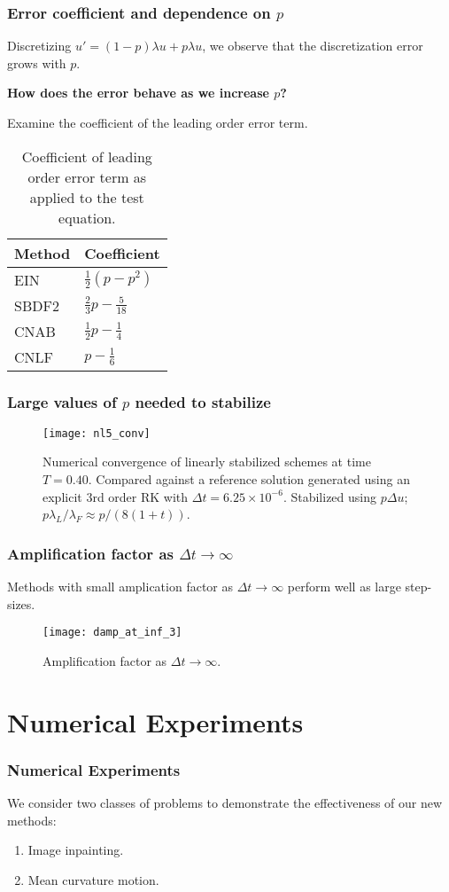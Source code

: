 \documentclass[hyperref={pdfpagelabels=false}]{beamer}
\begin{document}
\begin{frame}
	\frametitle{Error coefficient and dependence on $p$}
Discretizing $u' = (1- p)\lambda u + p\lambda u$, we observe that the discretization error grows with $p$.

\textbf{How does the error behave as we increase $p$?}

Examine the coefficient of the leading order error term.
\vspace{-11pt}
\begin{table}[b]
	\centering 
	\caption{Coefficient of leading order error term as applied to the test equation.}
\renewcommand{\arraystretch}{1.10}
	\begin{tabular}{ll} 
		\toprule 
Method & Coefficient 
\\ \midrule 
EIN & $\frac{1}{2}(p-p^2)$ 
\\
SBDF2 & $\frac{2}{3}p - \frac{5}{18}$
\\ 
CNAB & $\frac{1}{2}p-\frac{1}{4}$
\\ 
CNLF & $p-\frac{1}{6}$
\\ \bottomrule
		\end{tabular}
	\end{table}
\end{frame}


\begin{frame}
	\frametitle{Large values of $p$ needed to stabilize}
	\begin{figure}[t]
		\centering
		\texttt{[image: nl5\_conv]}
		\caption{Numerical convergence of linearly stabilized schemes at time $T=0.40$. Compared against a reference solution generated using an explicit 3rd order RK with $\Delta t = 6.25\times 10^{-6}$. Stabilized using $p\Delta u$; $p\lambda_L / \lambda_F \approx p/(8(1+t))$.}
	\end{figure} 
\end{frame}

\begin{frame}
	\frametitle{Amplification factor as $\Delta t\to\infty$}
Methods with small amplication factor as $\Delta t \to \infty$ perform well as large step-sizes. 
\vspace{-5pt}
\begin{figure}
	\centering 
	\texttt{[image: damp\_at\_inf\_3]}
	\caption{Amplification factor as $\Delta t \to \infty$.}
\end{figure}
\end{frame}

\section{Numerical Experiments}
\begin{frame}
        \frametitle{Numerical Experiments} 
We consider two classes of problems to demonstrate the effectiveness of our new methods: 
\begin{enumerate}
        \item Image inpainting.
	\item Mean curvature motion.
\end{enumerate}

\end{frame}
\end{document}
